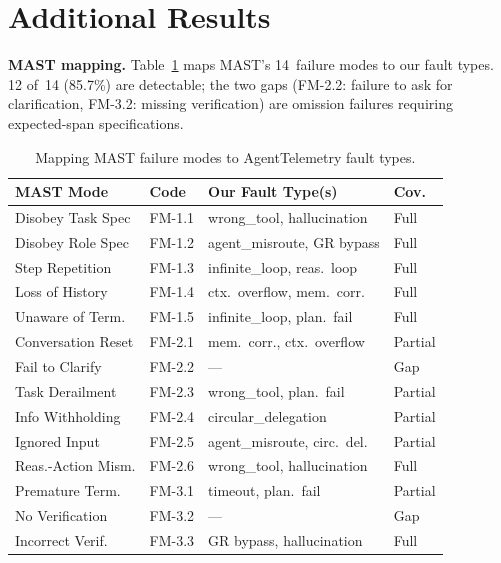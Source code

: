 \documentclass{article}
\begin{document}

\appendix

\section{Additional Results}

\textbf{MAST mapping.}
Table~\ref{tab:mast-mapping} maps MAST's 14~failure modes to our fault types.  12 of~14 (85.7\%) are detectable; the two gaps (FM-2.2: failure to ask for clarification, FM-3.2: missing verification) are omission failures requiring expected-span specifications.

\begin{table}[ht]
\centering
\scriptsize
\caption{Mapping MAST failure modes to AgentTelemetry fault types.}
\label{tab:mast-mapping}
\begin{tabular}{@{}llll@{}}
\toprule
\textbf{MAST Mode} & \textbf{Code} & \textbf{Our Fault Type(s)} & \textbf{Cov.} \\
\midrule
Disobey Task Spec   & FM-1.1 & wrong\_tool, hallucination  & Full \\
Disobey Role Spec   & FM-1.2 & agent\_misroute, GR bypass  & Full \\
Step Repetition     & FM-1.3 & infinite\_loop, reas.\ loop & Full \\
Loss of History     & FM-1.4 & ctx.\ overflow, mem.\ corr. & Full \\
Unaware of Term.    & FM-1.5 & infinite\_loop, plan.\ fail & Full \\
Conversation Reset  & FM-2.1 & mem.\ corr., ctx.\ overflow & Partial \\
Fail to Clarify     & FM-2.2 & --- & Gap \\
Task Derailment     & FM-2.3 & wrong\_tool, plan.\ fail    & Partial \\
Info Withholding    & FM-2.4 & circular\_delegation         & Partial \\
Ignored Input       & FM-2.5 & agent\_misroute, circ.\ del. & Partial \\
Reas.-Action Mism.  & FM-2.6 & wrong\_tool, hallucination  & Full \\
Premature Term.     & FM-3.1 & timeout, plan.\ fail        & Partial \\
No Verification     & FM-3.2 & --- & Gap \\
Incorrect Verif.    & FM-3.3 & GR bypass, hallucination    & Full \\
\bottomrule
\end{tabular}
\end{table}
\end{document}
